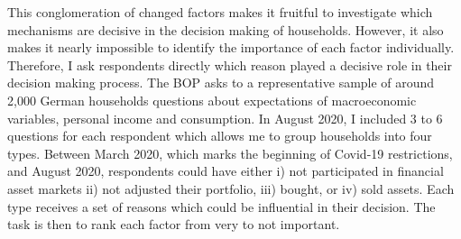 \documentclass[ProjectABM]{subfiles}
\begin{document}










This conglomeration of changed factors makes it fruitful to investigate which mechanisms are decisive in the decision making of households. However, it also makes it nearly impossible to identify the importance of each factor individually. Therefore, I ask respondents directly which reason played a decisive role in their decision making process. The BOP asks to a representative sample of around 2,000 German households questions about expectations of macroeconomic variables, personal income and consumption. In August 2020, I included 3 to 6 questions for each respondent which allows me to group households into four types. Between March 2020, which marks the beginning of Covid-19 restrictions, and August 2020, respondents could have either i) not participated in financial asset markets ii) not adjusted their portfolio, iii) bought, or iv) sold assets. Each type receives a set of reasons which could be influential in their decision. The task is then to rank each factor from very to not important.
\end{document}
